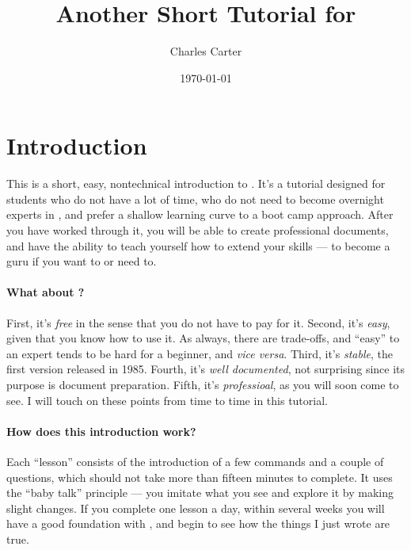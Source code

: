 \documentclass{article}
\title{Another Short Tutorial for \LaTeXe}
\author{Charles Carter}
\date{\today{}}
\begin{document}
    \maketitle{}
    
    \tableofcontents{}

	\newpage{}

    \section{Introduction}
    \label{Introduction}

	This is a short, easy, nontechnical introduction to \LaTeXe{}. It's a tutorial designed for students who do not have a lot of time, who do not need to become overnight experts in \LaTeXe{}, and prefer a shallow learning curve to a boot camp approach.  After you have worked through it, you will be able to create professional documents, and have the ability to teach yourself how to extend your \LaTeXe{} skills --- to become a \LaTeXe guru if you want to or need to.

    \paragraph{What about \LaTeXe{}?}First, it's \textit{free} in the sense that you do not have to pay for it. Second, it's \textit{easy}, given that you know how to use it. As always, there are trade-offs, and ``easy'' to an expert tends to be hard for a beginner, and \textit{vice versa}. Third, it's \textit{stable}, the first version released in 1985. Fourth, it's \textit{well documented}, not surprising since its purpose is document preparation. Fifth, it's \textit{professioal}, as you will soon come to see. I will touch on these points from time to time in this tutorial.

    \paragraph{How does this introduction work?}Each ``lesson'' consists of the introduction of a few commands and a couple of questions, which should not take more than fifteen minutes to complete. It uses the ``baby talk'' principle --- you imitate what you see and explore it by making slight changes. If you complete one lesson a day, within several weeks you will have a good foundation with \LaTeXe{}, and begin to see how the things I just wrote are true.

	
\end{document}
